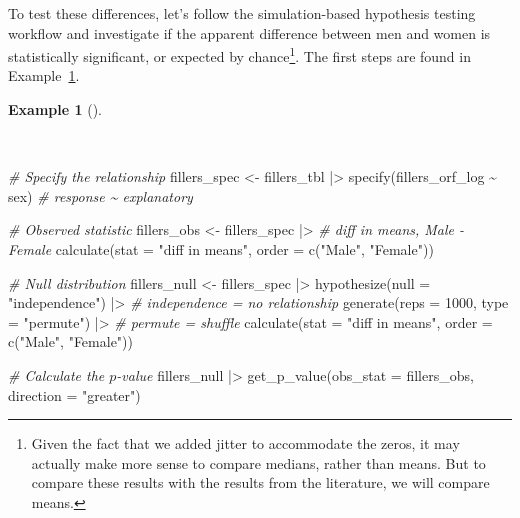 \documentclass[
  letterpaper,
  krantz1]{latex/krantz-mod}
\newenvironment{Shaded}{\begin{snugshade}}{\end{snugshade}}
\newcommand{\AttributeTok}[1]{\textcolor[rgb]{0.00,0.00,0.00}{#1}}
\newcommand{\CommentTok}[1]{\textcolor[rgb]{0.00,0.00,0.00}{\textit{#1}}}
\newcommand{\DecValTok}[1]{\textcolor[rgb]{0.00,0.00,0.00}{#1}}
\newcommand{\FunctionTok}[1]{\textcolor[rgb]{0.00,0.00,0.00}{#1}}
\newcommand{\NormalTok}[1]{\textcolor[rgb]{0.00,0.00,0.00}{#1}}
\newcommand{\OtherTok}[1]{\textcolor[rgb]{0.00,0.00,0.00}{#1}}
\newcommand{\SpecialCharTok}[1]{\textcolor[rgb]{0.00,0.00,0.00}{#1}}
\newcommand{\StringTok}[1]{\textcolor[rgb]{0.00,0.00,0.00}{#1}}
\theoremstyle{definition}
\theoremstyle{definition}
\newtheorem{example}{Example}[chapter]
\theoremstyle{remark}
\begin{document}
To test these differences, let's follow the simulation-based hypothesis
testing workflow and investigate if the apparent difference between men
and women is statistically significant, or expected by
chance\footnote{Given the fact that we added jitter to accommodate the
  zeros, it may actually make more sense to compare medians, rather than
  means. But to compare these results with the results from the
  literature, we will compare means.}. The first steps are found in
Example~\ref{exm-infer-num-bi-sex-null}.

\pagebreak

\begin{example}[]\protect\hypertarget{exm-infer-num-bi-sex-null}{}\label{exm-infer-num-bi-sex-null}

~

\begin{Shaded}
\begin{Highlighting}[numbers=left,,]
\CommentTok{\# Specify the relationship}
\NormalTok{fillers\_spec }\OtherTok{\textless{}{-}}
\NormalTok{  fillers\_tbl }\SpecialCharTok{|\textgreater{}}
  \FunctionTok{specify}\NormalTok{(fillers\_orf\_log }\SpecialCharTok{\textasciitilde{}}\NormalTok{ sex) }\CommentTok{\# response \textasciitilde{} explanatory}

\CommentTok{\# Observed statistic}
\NormalTok{fillers\_obs }\OtherTok{\textless{}{-}}
\NormalTok{  fillers\_spec }\SpecialCharTok{|\textgreater{}}
  \CommentTok{\# diff in means, Male {-} Female}
  \FunctionTok{calculate}\NormalTok{(}\AttributeTok{stat =} \StringTok{"diff in means"}\NormalTok{, }\AttributeTok{order =} \FunctionTok{c}\NormalTok{(}\StringTok{"Male"}\NormalTok{, }\StringTok{"Female"}\NormalTok{))}

\CommentTok{\# Null distribution}
\NormalTok{fillers\_null }\OtherTok{\textless{}{-}}
\NormalTok{  fillers\_spec }\SpecialCharTok{|\textgreater{}}
  \FunctionTok{hypothesize}\NormalTok{(}\AttributeTok{null =} \StringTok{"independence"}\NormalTok{) }\SpecialCharTok{|\textgreater{}} \CommentTok{\# independence = no relationship}
  \FunctionTok{generate}\NormalTok{(}\AttributeTok{reps =} \DecValTok{1000}\NormalTok{, }\AttributeTok{type =} \StringTok{"permute"}\NormalTok{) }\SpecialCharTok{|\textgreater{}} \CommentTok{\# permute = shuffle}
  \FunctionTok{calculate}\NormalTok{(}\AttributeTok{stat =} \StringTok{"diff in means"}\NormalTok{, }\AttributeTok{order =} \FunctionTok{c}\NormalTok{(}\StringTok{"Male"}\NormalTok{, }\StringTok{"Female"}\NormalTok{))}

\CommentTok{\# Calculate the $p${-}value}
\NormalTok{fillers\_null }\SpecialCharTok{|\textgreater{}}
  \FunctionTok{get\_p\_value}\NormalTok{(}\AttributeTok{obs\_stat =}\NormalTok{ fillers\_obs, }\AttributeTok{direction =} \StringTok{"greater"}\NormalTok{)}
\end{Highlighting}
\end{Shaded}


\end{example}
\end{document}
